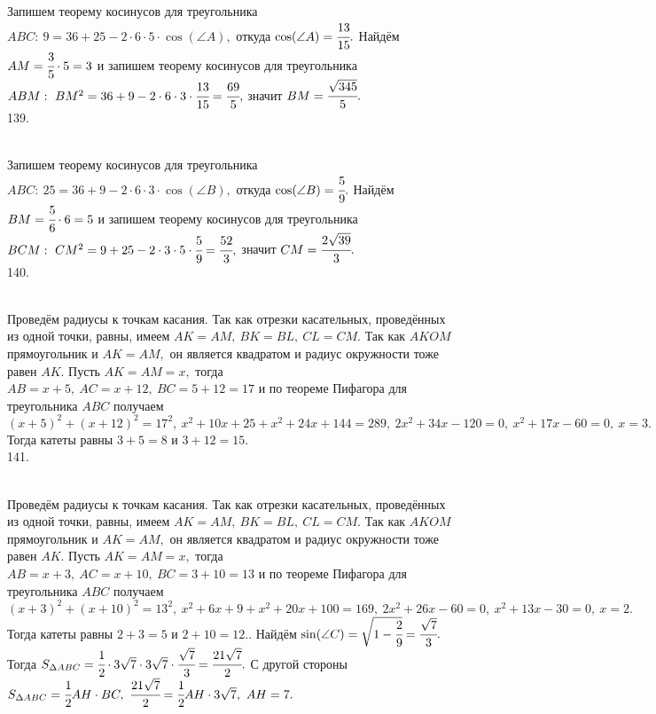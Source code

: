 Запишем теорему косинусов для треугольника $ABC:\ 9=36+25-2\cdot6\cdot5\cdot\cos(\angle A),$ откуда $\cos(\angle A)=\cfrac{13}{15}.$ Найдём $AM=\cfrac{3}{5}\cdot5=3$ и запишем теорему косинусов для треугольника $ABM:\ BM^2=36+9-2\cdot6\cdot3\cdot\cfrac{13}{15}=\cfrac{69}{5},$ значит $BM=\cfrac{\sqrt{345}}{5}.$\\
139. \begin{figure}[ht!]
\end{figure}\\
Запишем теорему косинусов для треугольника $ABC:\ 25=36+9-2\cdot6\cdot3\cdot\cos(\angle B),$ откуда $\cos(\angle B)=\cfrac{5}{9}.$ Найдём $BM=\cfrac{5}{6}\cdot6=5$ и запишем теорему косинусов для треугольника $BCM:\ CM^2=9+25-2\cdot3\cdot5\cdot\cfrac{5}{9}=\cfrac{52}{3},$ значит $CM=\cfrac{2\sqrt{39}}{3}.$\\
140. \begin{figure}[ht!]
\end{figure}\\
Проведём радиусы к точкам касания. Так как отрезки касательных, проведённых из одной точки, равны, имеем $AK=AM,\ BK=BL,\ CL=CM.$ Так как $AKOM$ прямоугольник и $AK=AM,$ он является квадратом и радиус окружности тоже равен $AK.$ Пусть $AK=AM=x,$ тогда $AB=x+5,\ AC=x+12,\ BC=5+12=17$ и по теореме Пифагора для треугольника $ABC$ получаем $(x+5)^2+(x+12)^2=17^2,\ x^2+10x+25+x^2+24x+144=289,\ 2x^2+34x-120=0,\ x^2+17x-60=0,\ x=3.$ Тогда катеты равны $3+5=8$ и $3+12=15.$\\
141. \begin{figure}[ht!]
\end{figure}\\
Проведём радиусы к точкам касания. Так как отрезки касательных, проведённых из одной точки, равны, имеем $AK=AM,\ BK=BL,\ CL=CM.$ Так как $AKOM$ прямоугольник и $AK=AM,$ он является квадратом и радиус окружности тоже равен $AK.$ Пусть $AK=AM=x,$ тогда $AB=x+3,\ AC=x+10,\ BC=3+10=13$ и по теореме Пифагора для треугольника $ABC$ получаем $(x+3)^2+(x+10)^2=13^2,\ x^2+6x+9+x^2+20x+100=169,\ 2x^2+26x-60=0,\ x^2+13x-30=0,\ x=2.$ Тогда катеты равны $2+3=5$ и $2+10=12.$\newpage{}. Найдём $\sin(\angle C)=\sqrt{1-\cfrac{2}{9}}=\cfrac{\sqrt{7}}{3}.$ Тогда $S_{\Delta ABC}=\cfrac{1}{2}\cdot3\sqrt{7}\cdot3\sqrt{7}\cdot\cfrac{\sqrt{7}}{3}=
\cfrac{21\sqrt{7}}{2}.$ С другой стороны $S_{\Delta ABC}=\cfrac{1}{2}AH\cdot BC,\ \cfrac{21\sqrt{7}}{2}=\cfrac{1}{2}AH\cdot3\sqrt{7},\ AH=7.$\\

